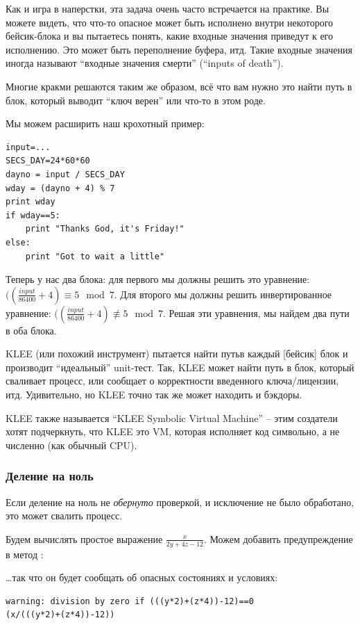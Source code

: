Как и игра в наперстки, эта задача очень часто встречается на практике.
Вы можете видеть, что что-то опасное может быть исполнено внутри некоторого бейсик-блока и вы пытаетесь понять,
какие входные значения приведут к его исполнению.
Это может быть переполнение буфера, итд.
Такие входные значения иногда называют ``входные значения смерти'' (``inputs of death'').

Многие кракми решаются таким же образом, всё что вам нужно это найти путь в блок, который выводит ``ключ верен''
или что-то в этом роде.

Мы можем расширить наш крохотный пример:

\begin{lstlisting}
input=...
SECS_DAY=24*60*60
dayno = input / SECS_DAY
wday = (dayno + 4) % 7
print wday
if wday==5:
    print "Thanks God, it's Friday!"
else:
    print "Got to wait a little"
\end{lstlisting}

Теперь у нас два блока: для первого мы должны решить это уравнение: $((\frac{input}{86400}+4) \equiv 5 \mod 7$.
Для второго мы должны решить инвертированное уравнение: $((\frac{input}{86400}+4) \not\equiv 5 \mod 7$.
Решая эти уравнения, мы найдем два пути в оба блока.

KLEE (или похожий инструмент) пытается найти путьв каждый [бейсик] блок и производит ``идеальный'' unit-тест.
Так, KLEE может найти путь в блок, который сваливает процесс, или сообщает о корректности введенного ключа/лицензии, итд.
Удивительно, но KLEE точно так же может находить и бэкдоры.

KLEE также называется ``KLEE Symbolic Virtual Machine'' -- этим создатели хотят подчеркнуть, что KLEE это \ac{VM},
которая исполняет код символьно, а не численно (как обычный \ac{CPU}).

\subsubsection{Деление на ноль}

Если деление на ноль не \textit{обернуто} проверкой, и исключение не было обработано, это может свалить процесс.

Будем вычислять простое выражение $\frac{x}{2y + 4z - 12}$.
Можем добавить предупреждение в метод :



\dots так что он будет сообщать об опасных состояниях и условиях:

\begin{lstlisting}
warning: division by zero if (((y*2)+(z*4))-12)==0
(x/(((y*2)+(z*4))-12))
\end{lstlisting}

